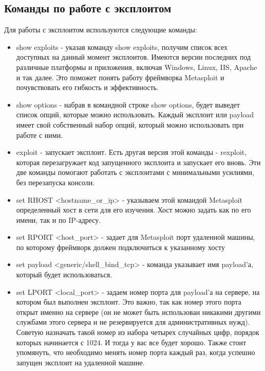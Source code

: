 \documentclass[11pt, a4paper]{article}		%
\begin{document}

\subsection{Команды по работе с эксплоитом}

Для работы с эксплоитом используются следующие команды:

\begin{itemize}

\item show exploits - указав команду show exploits, получим список всех доступных на данный момент эксплоитов. Имеются версии последних под различные платформы и приложения, включая Windows, Linux, IIS, Apache и так далее. Это поможет понять работу фреймворка Metasploit и почувствовать его гибкость и эффективность.

\item show options - набрав в командной строке show options, будет выведет список опций, которые можно использовать. Каждый эксплоит или payload имеет свой собственный набор опций, который можно использовать при работе с ними.

\item exploit - запускает эксплоит. Есть другая версия этой команды - rexploit, которая перезагружает код запущенного эксплоита и запускает его вновь. Эти две команды помогают работать с эксплоитами с минимальными усилиями, без перезапуска консоли.

\item set RHOST <hostname\_or\_ip> - указываем этой командой Metasploit определенный хост в сети для его изучения. Хост можно задать как по его имени, так и по IP-адресу.

\item set RPORT <host\_port> - задает для Metasploit порт удаленной машины, по которому фреймворк должен подключиться к указанному хосту

\item set payload <generic/shell\_bind\_tcp> - команда указывает имя payload’а, который будет использоваться.

\item  set LPORT <local\_port> - задаем номер порта для payload’а на сервере, на котором был выполнен эксплоит. Это важно, так как номер этого порта открыт именно на сервере (он не может быть использован никакими другими службами этого сервера и не резервируется для административных нужд). Советую назначать такой номер из набора четырех случайных цифр, порядок которых начинается с 1024. И тогда у вас все будет хорошо. Также стоит упомянуть, что необходимо менять номер порта каждый раз, когда успешно запущен эксплоит на удаленной машине.

\end{itemize}
\end{document}
